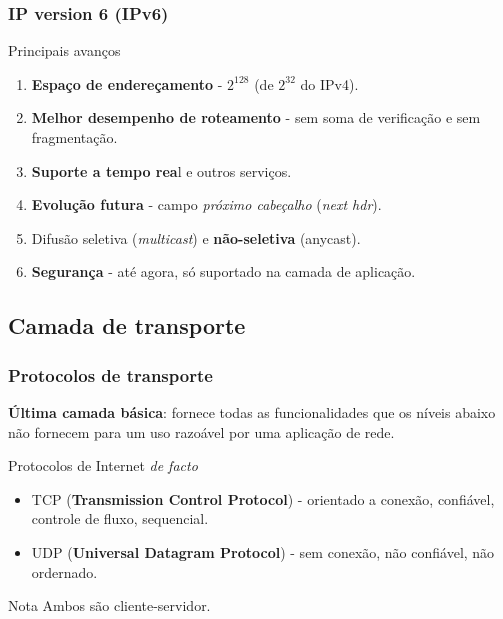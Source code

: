 \documentclass[xcolor=dvipsnames,10pt,compress,aspectratio=169]{beamer}
\newcommand{\blue}[1]{{\color{blue}#1}}
\begin{document}
\begin{frame}
  \frametitle{IP version 6 (IPv6)}
  \begin{exampleblock}{Principais avanços}
    \begin{enumerate}
    \item {\bf Espaço de endereçamento} - $2^{128}$ (de $2^{32}$ do IPv4).
    \item {\bf Melhor desempenho de roteamento} - sem soma de verificação e sem fragmentação.
    \item {\bf Suporte a tempo rea}l e outros serviços.
    \item {\bf Evolução futura} - campo \emph{próximo cabeçalho} (\emph{next hdr}).
    \item Difusão seletiva (\emph{multicast}) e {\bf não-seletiva} (\alert{anycast}).
    \item {\bf Segurança} - até agora, só suportado na camada de aplicação.
    \end{enumerate}
  \end{exampleblock}
\end{frame}

\subsection{Camada de transporte}

\begin{frame}
  \frametitle{Protocolos de transporte}
  \textbf{Última camada básica}: fornece todas as funcionalidades que os níveis abaixo não fornecem para um uso razoável 
  por uma aplicação de rede.
  \begin{block}{Protocolos de Internet \emph{de facto}}
    \begin{itemize}
    \item \blue{TCP} ({\bf Transmission Control Protocol}) -  orientado a conexão, confiável, controle de fluxo, sequencial.
    \item \blue{UDP} ({\bf Universal Datagram Protocol}) - sem conexão, não confiável, não ordernado.
    \end{itemize}
  \end{block}
  \pause
  \begin{alertblock}{Nota}
    Ambos são cliente-servidor.
  \end{alertblock}
\end{frame}
\end{document}
